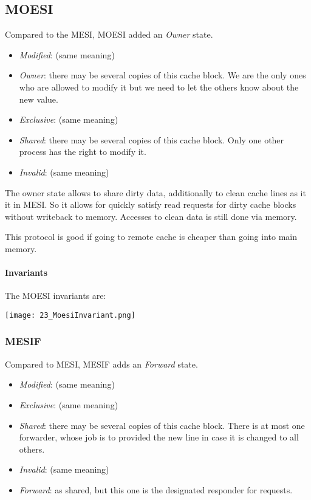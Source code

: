 

\subsection*{MOESI}
Compared to the MESI, MOESI added an \textit{Owner} state. 

\begin{itemize}
    \item \textit{Modified}: (same meaning)
    \item \textit{Owner}: there may be several copies of this cache block. We are the only ones who are allowed to modify it but we need to let the others know about the new value.
    \item \textit{Exclusive}: (same meaning)
    \item \textit{Shared}: there may be several copies of this cache block. Only one other process has the right to modify it.
    \item \textit{Invalid}: (same meaning)
\end{itemize}

The owner state allows to share dirty data, additionally to clean cache lines as it it in MESI. So it allows for quickly satisfy read requests for dirty cache blocks without writeback to memory. Accesses to clean data is still done via memory.

This protocol is good if going to remote cache is cheaper than going into main memory.

\paragraph{Invariants}
The MOESI invariants are:

\texttt{[image: 23\_MoesiInvariant.png]}

\subsubsection{MESIF}
Compared to MESI, MESIF adds an \textit{Forward} state.

\begin{itemize}
    \item \textit{Modified}: (same meaning)
    \item \textit{Exclusive}: (same meaning)
    \item \textit{Shared}: there may be several copies of this cache block. There is at most one forwarder, whose job is to provided the new line in case it is changed to all others.
    \item \textit{Invalid}: (same meaning)
    \item \textit{Forward}: as shared, but this one is the designated responder for requests.
\end{itemize}

